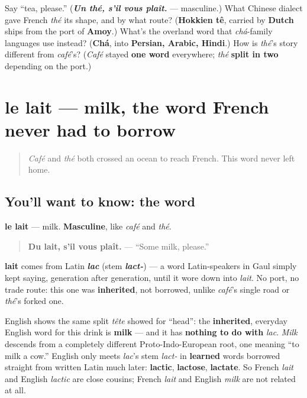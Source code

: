 \begin{tcolorbox}[breakable,colback=teal!4,colframe=teal!35!black,title={Before you move on}]
Say \textquotedblleft{}tea, please.\textquotedblright{} (\emph{\textbf{Un thé, s'il vous plaît.}} — masculine.) What Chinese dialect gave French \emph{thé} its shape, and by what route? (\textbf{Hokkien tê}, carried by \textbf{Dutch} ships from the port of \textbf{Amoy}.) What's the overland word that \emph{chá}-family languages use instead? (\textbf{Chá}, into \textbf{Persian, Arabic, Hindi}.) How is \emph{thé}'s story different from \emph{café}'s? (\emph{Café} stayed \textbf{one word} everywhere; \emph{thé} \textbf{split in two} depending on the port.)
\end{tcolorbox}
\section[le lait]{le lait — milk, the word French never had to borrow}

\label{lesson:FR-C28-lait}



\begin{quote}
\emph{Café} and \emph{thé} both crossed an ocean to reach French. This word never left home.
\end{quote}

\subsection*{You'll want to know: the word}
\textbf{le lait} — milk. \textbf{Masculine}, like \emph{café} and \emph{thé}.

\begin{quote}
\textbf{Du lait, s'il vous plaît.} — \textquotedblleft{}Some milk, please.\textquotedblright{}
\end{quote}

\begin{cousinweb}
\textbf{lait} comes from Latin \emph{\textbf{lac}} (stem \emph{\textbf{lact-}}) — a word Latin-speakers in Gaul simply kept saying, generation after generation, until it wore down into \emph{lait}. No port, no trade route: this one was \textbf{inherited}, not borrowed, unlike \emph{café}'s single road or \emph{thé}'s forked one.

English shows the same split \emph{tête} showed for \textquotedblleft{}head\textquotedblright{}: the \textbf{inherited}, everyday English word for this drink is \textbf{milk} — and it has \textbf{nothing to do with} \emph{lac}. \emph{Milk} descends from a completely different Proto-Indo-European root, one meaning \textquotedblleft{}to milk a cow.\textquotedblright{} English only meets \emph{lac}'s stem \emph{lact-} in \textbf{learned} words borrowed straight from written Latin much later: \textbf{lactic}, \textbf{lactose}, \textbf{lactate}. So French \emph{lait} and English \emph{lactic} are close cousins; French \emph{lait} and English \emph{milk} are not related at all.
\end{cousinweb}

